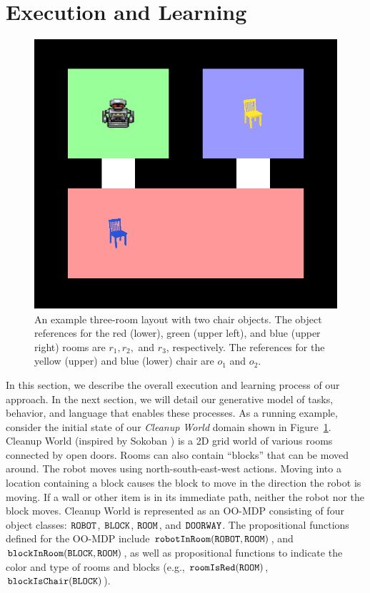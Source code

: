 \documentclass[conference]{IEEEtran}
\begin{document}
\section{Execution and Learning}
\label{sec:el}
\begin{figure}[tbp]
\begin{center}
\includegraphics[width=0.7\columnwidth]{images/exampleFloor}
\caption{\small An example three-room layout with two chair objects. The object references for the red (lower), green (upper left), and blue (upper right) rooms are $r_1, r_2,$ and $r_3$, respectively. The references for the yellow (upper) and blue (lower) chair are $o_1$ and $o_2$.
}
\label{fig:ef}
\end{center}
\end{figure}
In this section, we describe the overall execution and learning process of our approach. In the next section, we will detail our generative model of tasks, behavior, and language that enables these processes. As a running example, consider the initial state of our {\em Cleanup World} domain shown in Figure~\ref{fig:ef}. Cleanup World (inspired by Sokoban \cite{junghanns1997sokoban}) is a 2D grid world of various rooms connected by open doors. Rooms can also contain ``blocks'' that can be moved around. The robot moves using north-south-east-west actions. Moving into a location containing a block causes the block to move in the direction the robot is moving. If a wall or other item is in its immediate path, neither the robot nor the block moves. Cleanup World is represented as an OO-MDP consisting of four object classes: ${\tt ROBOT}$, ${\tt BLOCK}$, ${\tt ROOM}$, and ${\tt DOORWAY}$.
The propositional functions defined for the OO-MDP include ${\tt robotInRoom}({\tt ROBOT}, {\tt ROOM})$, and ${\tt blockInRoom}({\tt BLOCK}, {\tt ROOM})$, as well as propositional functions to indicate the color and type of rooms and blocks (e.g., ${\tt roomIsRed}({\tt ROOM})$, ${\tt blockIsChair}({\tt BLOCK})$).
\end{document}
